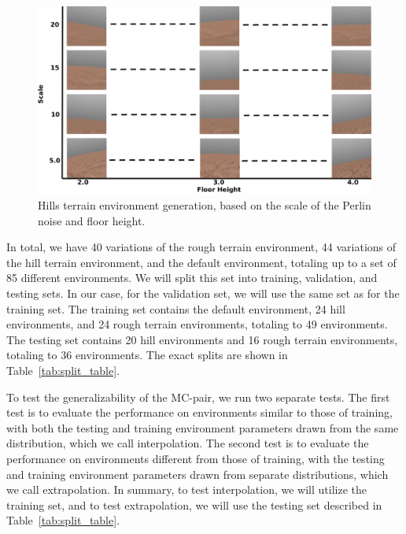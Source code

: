         \begin{figure}[ht]
            \centering
            \includegraphics[width=\linewidth]{./resources/hills_terrain.png}
            \caption{Hills terrain environment generation, based on the scale of the Perlin noise and floor height.}
            \label{fig:hills_terrain}
        \end{figure}

        In total, we have 40 variations of the rough terrain environment, 44 variations of the hill terrain environment, and the default environment, totaling up to a set of 85 different environments. We will split this set into training, validation, and testing sets. In our case, for the validation set, we will use the same set as for the training set. The training set contains the default environment, 24 hill environments, and 24 rough terrain environments, totaling to 49 environments. The testing set contains 20 hill environments and 16 rough terrain environments, totaling to 36 environments. The exact splits are shown in Table~\ref{tab:split_table}.

        To test the generalizability of the MC-pair, we run two separate tests. The first test is to evaluate the performance on environments similar to those of training, with both the testing and training environment parameters drawn from the same distribution, which we call interpolation. The second test is to evaluate the performance on environments different from those of training, with the testing and training environment parameters drawn from separate distributions, which we call extrapolation. In summary, to test interpolation, we will utilize the training set, and to test extrapolation, we will use the testing set described in Table~\ref{tab:split_table}.

